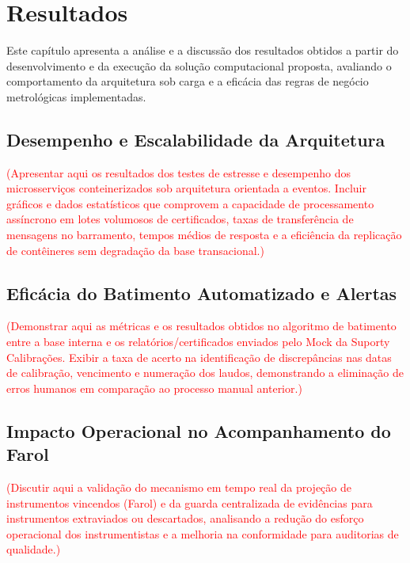 \chapter{Resultados}

Este capítulo apresenta a análise e a discussão dos resultados obtidos a partir do desenvolvimento e da execução da solução computacional proposta, avaliando o comportamento da arquitetura sob carga e a eficácia das regras de negócio metrológicas implementadas.

\section{Desempenho e Escalabilidade da Arquitetura}

\textcolor{red}{(Apresentar aqui os resultados dos testes de estresse e desempenho dos microsserviços conteinerizados sob arquitetura orientada a eventos. Incluir gráficos e dados estatísticos que comprovem a capacidade de processamento assíncrono em lotes volumosos de certificados, taxas de transferência de mensagens no barramento, tempos médios de resposta e a eficiência da replicação de contêineres sem degradação da base transacional.)}

\section{Eficácia do Batimento Automatizado e Alertas}

\textcolor{red}{(Demonstrar aqui as métricas e os resultados obtidos no algoritmo de batimento entre a base interna e os relatórios/certificados enviados pelo Mock da Suporty Calibrações. Exibir a taxa de acerto na identificação de discrepâncias nas datas de calibração, vencimento e numeração dos laudos, demonstrando a eliminação de erros humanos em comparação ao processo manual anterior.)}

\section{Impacto Operacional no Acompanhamento do Farol}

\textcolor{red}{(Discutir aqui a validação do mecanismo em tempo real da projeção de instrumentos vincendos (Farol) e da guarda centralizada de evidências para instrumentos extraviados ou descartados, analisando a redução do esforço operacional dos instrumentistas e a melhoria na conformidade para auditorias de qualidade.)}

